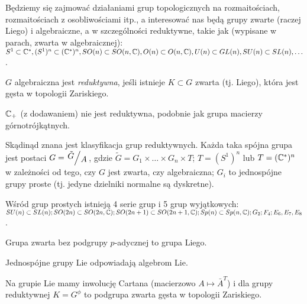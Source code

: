 

 

 Będziemy się zajmować działaniami grup topologicznych na rozmaitościach, rozmaitościach z osobliwościami itp., a interesować nas będą grupy zwarte (raczej Liego) i algebraiczne, a w szczególności reduktywne, takie jak (wypisane w parach, zwarta w algebraicznej): $S^1 \subset {\mathbb{C}}^\ast, (S^1)^n \subset ({\mathbb{C}}^\ast)^n, SO(n) \subset SO(n,{\mathbb{C}}), O(n) \subset O(n, {\mathbb{C}}), U(n) \subset GL(n), SU(n) \subset SL(n), \ldots$.
 
 \begin{definicja}
  $G$ algebraiczna jest \emph{reduktywna}, jeśli istnieje $K \subset G$ zwarta (tj. Liego), która jest gęsta w topologii Zariskiego.
 \end{definicja}
 
 \begin{przyklad}
  ${\mathbb{C}}_+$ (z dodawaniem) nie jest reduktywna, podobnie jak grupa macierzy górnotrójkątnych.
 \end{przyklad}
 
 \begin{uwaga}
  Skądinąd znana jest klasyfikacja grup reduktywnych. Każda taka spójna grupa jest postaci $G = \bigslant{\tilde{G}}{A}$, gdzie $\tilde{G} = G_1 \times \ldots \times G_n \times T$; $T=(S^1)^n$ lub $T=({\mathbb{C}}^\ast)^n$ w zależności od tego, czy $G$ jest zwarta, czy algebraiczna; $G_i$ to jednospójne grupy proste (tj. jedyne dzielniki normalne są dyskretne).
  
  Wśród grup prostych istnieją 4 serie grup i 5 grup wyjątkowych: $SU(n) \subset SL(n); SO(2n) \subset SO(2n, {\mathbb{C}}); SO(2n+1) \subset SO(2n+1, {\mathbb{C}}); Sp(n) \subset Sp(n,{\mathbb{C}}); G_2; F_4; E_6, E_7, E_8$.
 \end{uwaga}
 
 \begin{twierdzeniebd}
  Grupa zwarta bez podgrupy $p$-adycznej to grupa Liego.
 \end{twierdzeniebd}
 
 \begin{uwaga}
  Jednospójne grupy Lie odpowiadają algebrom Lie.
 \end{uwaga}
 
 \begin{uwaga}
  Na grupie Lie mamy inwolucję Cartana (macierzowo $A \mapsto \bar{A}^T$) i dla grupy reduktywnej $K=G^\phi$ to podgrupa zwarta gęsta w topologii Zariskiego.
 \end{uwaga}
 
